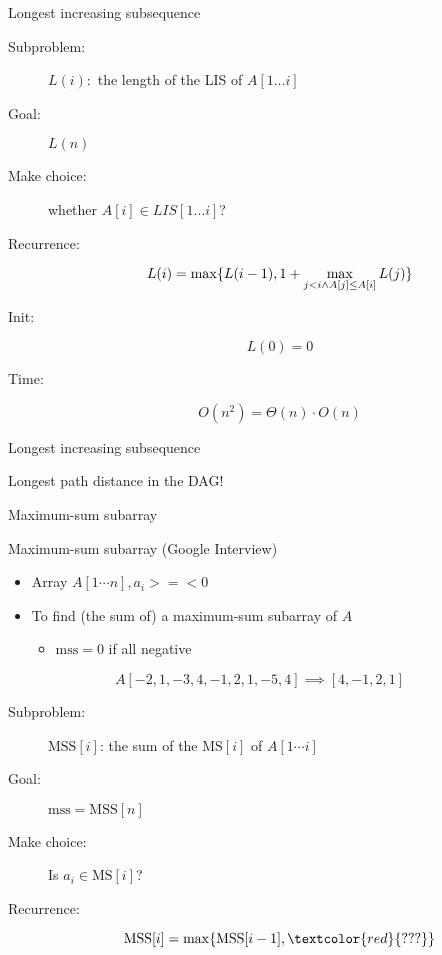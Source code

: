 \begin{frame}{Longest increasing subsequence}
  \begin{description}
	\item[Subproblem:] $L(i):$ the length of the LIS of $A[1 \ldots i]$
	\item[Goal:] $L(n)$
	  \pause
	\item[Make choice:] whether $A[i] \in LIS[1 \ldots i]$?
	\item[Recurrence:] 
	  \[
		L(i) = \max \{L(i-1), 1 + \max_{j < i \land A[j] \le A[i]} L(j)\}
	  \]
	  \pause
	\item[Init:]
	  \[
		L(0) = 0
	  \]
	\item[Time:] 
	  \[
		O(n^2) = \Theta(n) \cdot O(n)
	  \]
  \end{description}
\end{frame}
\begin{frame}{Longest increasing subsequence}

  \centerline{Longest path distance in the DAG!}
\end{frame}
\begin{frame}{Maximum-sum subarray}
  \begin{exampleblock}{Maximum-sum subarray (Google Interview)}
    \begin{itemize}
      \item Array $A[1 \cdots n], a_{i} >=< 0$
      \item To find (the sum of) a maximum-sum subarray of $A$
		\begin{itemize}
		  \item $\text{mss} = 0$ if all negative
		\end{itemize}
    \end{itemize}
	
    \[
      A[-2,1 ,-3,4,-1,2,1,-5,4] \implies [4,-1,2,1]
    \]
  \end{exampleblock}

  \pause
  \begin{description}
	\item[Subproblem:] $\text{MSS}[i]$: the sum of the $\text{MS}[i]$ of $A[1 \cdots i]$
	\item[Goal:] $\text{mss} = \text{MSS}[n]$
	\pause
	\item[Make choice:] Is $a_{i} \in \text{MS}[i]$?
	\item[Recurrence:]
	  \[ 
		\text{MSS}[i] = \max \set{\text{MSS}[i-1], \textcolor{red}{???}}
	  \]
  \end{description}
\end{frame}
